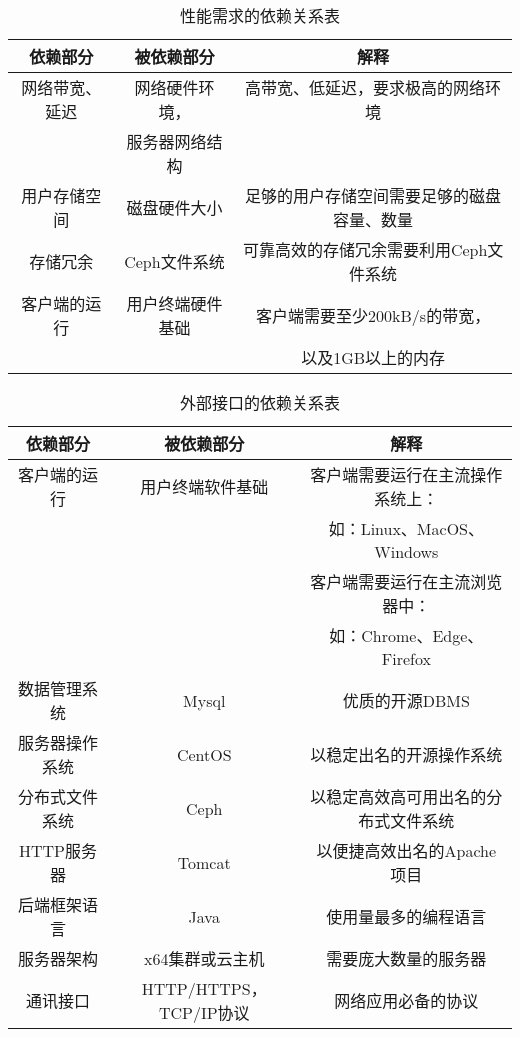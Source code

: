 {
\color{red}
\begin{table}[htbp]
\centering
\caption{性能需求的依赖关系表} \label{tab:simpletable}
\begin{tabular}{|c|c|c|}
    \hline
    依赖部分 & 被依赖部分 & 解释  \\
    \hline
    网络带宽、延迟 & 网络硬件环境， & 高带宽、低延迟，要求极高的网络环境 \\
    & 服务器网络结构 &  \\
    \hline
    用户存储空间 & 磁盘硬件大小 & 足够的用户存储空间需要足够的磁盘容量、数量 \\
    \hline
    存储冗余 & Ceph文件系统 & 可靠高效的存储冗余需要利用Ceph文件系统 \\
    \hline
    客户端的运行 & 用户终端硬件基础 & 客户端需要至少200kB/s的带宽，\\ & & 以及1GB以上的内存 \\
    \hline
    
\end{tabular}
\end{table} 

}


\begin{table}[htbp]
\centering
\caption{外部接口的依赖关系表} \label{tab:simpletable}
\begin{tabular}{|c|c|c|}
    \hline
    依赖部分 & 被依赖部分 & 解释  \\
    \hline
    客户端的运行 & 用户终端软件基础 & 客户端需要运行在主流操作系统上：\\ & & 如：Linux、MacOS、Windows \\ & & 客户端需要运行在主流浏览器中： \\ & & 如：Chrome、Edge、Firefox \\
    \hline
    数据管理系统 & Mysql & 优质的开源DBMS \\
    \hline
    服务器操作系统 & CentOS & 以稳定出名的开源操作系统\\
    \hline
    分布式文件系统 & Ceph & 以稳定高效高可用出名的分布式文件系统\\
    \hline
    HTTP服务器 & Tomcat & 以便捷高效出名的Apache项目 \\
    \hline
    后端框架语言 & Java & 使用量最多的编程语言\\
    \hline
    服务器架构 & x64集群或云主机 & 需要庞大数量的服务器\\
    \hline
    通讯接口 & HTTP/HTTPS，TCP/IP协议 & 网络应用必备的协议 \\
    \hline
    
\end{tabular}
\end{table} 



    
